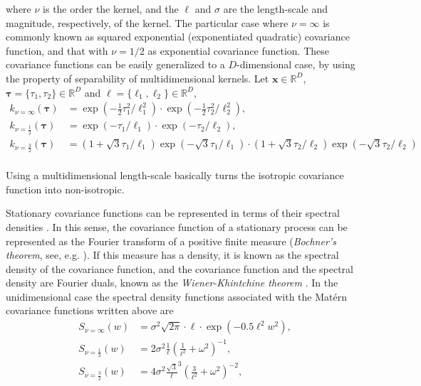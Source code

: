 \documentclass[]{interact}
\theoremstyle{plain}%
\theoremstyle{definition}
\theoremstyle{remark}
\begin{document}
\noindent where $\nu$ is the order the kernel, and the $\ell$ and $\sigma$ are the length-scale and magnitude, respectively, of the kernel. The particular case where $\nu=\infty$ is commonly known as squared exponential (exponentiated quadratic) covariance function, and that with $\nu=1/2$ as exponential covariance function. These covariance functions can be easily generalized to a $D$-dimensional case, by using the property of separability of multidimensional kernels. Let $\mathbf{x}\in \mathbb{R}^D$, $\mathbf{\bm{\tau}}=\{\tau_1,\tau_2\}\in \mathbb{R}^D$ and $\boldsymbol{\ell}=\{\ell_1,\ell_2\}\in \mathbb{R}^D$,
%
\begin{align*}
k_{\nu=\infty}(\bm{\tau})&=\exp(-\frac{1}{2} \tau_1^2/\ell_1^2) \cdot \exp(-\frac{1}{2} \tau_2^2/\ell_2^2), \\
k_{\nu=\frac{1}{2}}(\bm{\tau})&=\exp(-\tau_1/\ell_1) \cdot \exp(-\tau_2/\ell_2), \\
k_{\nu=\frac{3}{2}}(\bm{\tau})&=(1+\sqrt{3}\tau_1/\ell_1) \exp(-\sqrt{3}\tau_1/\ell_1) \cdot (1+\sqrt{3}\tau_2/\ell_2) \exp(-\sqrt{3}\tau_2/\ell_2) \\
\end{align*}

\noindent Using a multidimensional length-scale basically turns the isotropic covariance function into non-isotropic. 

Stationary covariance functions can be represented in terms of their spectral densities \citep{rasmussen2006gaussian}. In this sense, the covariance function of a stationary process can be represented as the Fourier transform of a positive finite measure (\textit{Bochner's theorem}, see, e.g. \cite{akhiezer1993theory}). If this measure has a density, it is known as the spectral density of the covariance function, and the covariance function and the spectral density are Fourier duals, known as the \textit{Wiener-Khintchine theorem} \citep{rasmussen2006gaussian}. In the unidimensional case the spectral density functions associated with the Mat\'ern covariance functions written above are
%
\begin{align}\label{eq:specdens}
S_{\nu=\infty}(w)&= \sigma^2 \sqrt{2\pi} \cdot \ell \cdot \exp\left(-0.5 \ell^2 w^2\right), \\
S_{\nu=\frac{1}{2}}(w)&= 2\sigma^2 \frac{1}{\ell}\left(\frac{1}{\ell^2} + \omega^2\right)^{-1}, \\
S_{\nu=\frac{3}{2}}(w)&= 4\sigma^2 \frac{\sqrt{3}}{\ell}^{3}\left(\frac{3}{\ell^2} + \omega^2\right)^{-2}, \\
\end{align}
\end{document}
